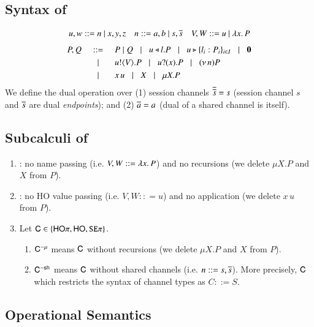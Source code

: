 \subsection{Syntax of \HOp}
\label{subsec:syntax}
\[ 
\begin{array}{lll}
u,w  ::=  n \ | \ x,y,z
& n ::= a,b  \ | \ s, \overline{s} 
& V,W  ::=   u \ | \ \lambda x.\,P
\end{array}
\]
\[
\begin{array}{rclllll}
P,Q & ::= &  P\;|\; Q \;\;\;|\;\;\; 
 u \triangleleft l . P \;\;\;|\;\;\; u \triangleright \{l_i:P_i\}_{i \in I} \;\;\;|\;\;\; \mathbf{0} \\[1mm]
  & \;\;\;|\;\;\; & u ! \langle V \rangle .{P} \;\;\;|\;\;\; u ? (x) .{P} \;\;\;|\;\;\; (\nu\, n) P \\[1mm]
      & \;\;\;|\;\;\; & x\, {u} \;\;\;|\;\;\; X \;\;\;|\;\;\; \mu X. P
\end{array}
\]
We define the dual operation over (1) session channels $\overline{\overline{s}} = s$
(session channel $s$ and $\overline{s}$ are dual \emph{endpoints}); and 
(2) $\overline{a} = a$ (dual of a shared channel is itself).  

\subsection{Subcalculi of \HOp}
\label{subsec:subcalculi}
\begin{enumerate}[$\bullet$]
\item \HO: no name passing (i.e. $V,W :: = \lambda x.\,P$) and no recursions
(we delete $\mu X.P$ and $X$ from $P$).    
\item \sessp: no HO value passing (i.e. $V,W :: = u$) and no application (we delete $x\, u$ from $P$). 
\item Let $\mathsf{C} \in \{\mathsf{HO}\pi, \mathsf{HO}, \mathtt{SE}\pi\}$. 
\begin{enumerate}[-]
\item $\mathsf{C}^{-\mu}$ means 
$\mathsf{C}$ without recursions (we delete $\mu X.P$ and $X$ from $P$).   
\item 
$\mathsf{C}^{-\mathsf{sh}}$ means $\mathsf{C}$ without shared channels (i.e. 
$n ::= s, \overline{s}$). More precisely, $\mathsf{C}$ which restricts 
the syntax of channel types as $C::= S$.  
\end{enumerate}
\end{enumerate}

\subsection{Operational Semantics}
\label{subsec:semantics}


